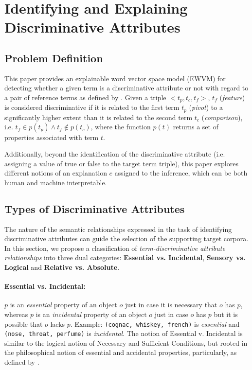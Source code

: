 \documentclass[11pt,a4paper]{article}
\begin{document}
\section{Identifying and Explaining Discriminative Attributes}

\subsection{Problem Definition}

This paper provides an explainable word vector space model (EWVM) for detecting whether a given term is a discriminative attribute or not with regard to a pair of reference terms as defined by \citet{semeval2018task10}. Given a triple $<t_p, t_c, t_f>$,  $t_f$ (\emph{feature}) is considered discriminative if it is related to the first term $t_p$ (\emph{pivot}) to a significantly higher extent than it is related to the second term $t_c$ (\emph{comparison}), i.e. \mbox{$t_f \in p(t_p) \land t_f \notin p(t_c)$}, where the function $p(t)$ returns a set of properties associated with term $t$. 

Additionally, beyond the identification of the discriminative attribute (i.e. assigning a value of true or false to the target term triple), this paper explores different notions of an explanation $e$ assigned to the inference, which can be both human and machine interpretable.

\subsection{Types of Discriminative Attributes}

The nature of the semantic relationships expressed in the task of identifying discriminative attributes can guide the selection of the supporting target corpora. In this section, we propose a classification of \textit{term-discriminative attribute relationships} into three dual categories: \textbf{Essential vs. Incidental}, \textbf{Sensory vs. Logical} and \textbf{Relative vs. Absolute}. 

\paragraph{Essential vs. Incidental:} $p$ is an \emph{essential} property of an object $o$ just in case it is necessary that $o$ has $p$, whereas $p$ is an \emph{incidental} property of an object $o$ just in case $o$ has $p$ but it is possible that $o$ lacks $p$. Example: \texttt{(cognac, whiskey, french)} is \emph{essential} and \texttt{(nose, throat, perfume)} is \emph{incidental}. The notion of Essential v. Incidental is similar to the logical notion of Necessary and Sufficient Conditions, but rooted in the philosophical notion of essential and accidental properties, particularly, as defined by \citet{robertson:1}.
\end{document}
